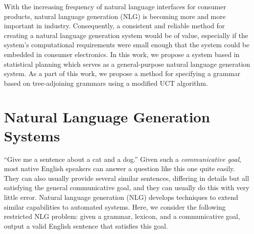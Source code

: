 With the increasing frequency of natural language interfaces for consumer
products, natural language generation (NLG) is becoming more and more important
in industry.  Consequently, a consistent and reliable method for creating a natural
language generation system would be of value, especially if the system's
computational requirements were small enough that the system could be embedded
in consumer electronics.  In this work, we propose a system based in statistical
planning which serves as a general-purpose natural language generation system.
As a part of this work, we propose a method for specifying a grammar based on
tree-adjoining grammars using a modified UCT algorithm.

\section{Natural Language Generation Systems}
``Give me a sentence about a cat and a dog.'' Given such a {\em
  communicative goal}, most native English speakers 
can answer a question like this one quite easily.
They can also usually provide several similar sentences,
differing in details but all satisfying the general communicative goal,
and they can usually do this with very little error. Natural language generation (NLG) develops
techniques to extend similar capabilities to automated systems. 
Here, we consider the following restricted NLG problem: given a
grammar, lexicon, and a communicative goal, output a valid English
sentence that satisfies this goal.